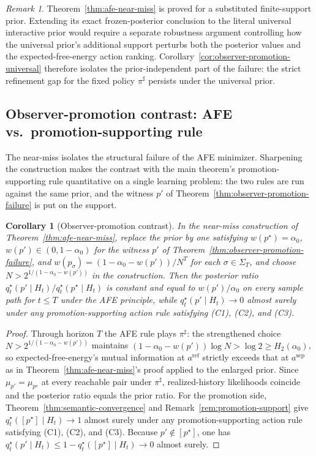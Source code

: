 \documentclass[11pt]{article}
\newtheorem{corollary}[theorem]{Corollary}
\theoremstyle{definition}
\theoremstyle{remark}
\newtheorem{remark}[theorem]{Remark}
\begin{document}
\begin{remark}
\label{rem:near-miss-universal}
Theorem~\ref{thm:afe-near-miss} is proved for a substituted finite-support prior. Extending its exact frozen-posterior conclusion to the literal universal interactive prior would require a separate robustness argument controlling how the universal prior's additional support perturbs both the posterior values and the expected-free-energy action ranking. Corollary~\ref{cor:observer-promotion-universal} therefore isolates the prior-independent part of the failure: the strict refinement gap for the fixed policy $\pi^\sharp$ persists under the universal prior.
\end{remark}

\subsection{Observer-promotion contrast: AFE vs.\ promotion-supporting rule}
\label{sec:promotion-contrast}

The near-miss isolates the structural failure of the AFE minimizer. Sharpening the construction makes the contrast with the main theorem's promotion-supporting rule quantitative on a single learning problem: the two rules are run against the same prior, and the witness $p'$ of Theorem~\ref{thm:observer-promotion-failure} is put on the support.

\begin{corollary}[Observer-promotion contrast]
\label{cor:promotion-contrast}
In the near-miss construction of Theorem~\ref{thm:afe-near-miss}, replace the prior by one satisfying $w(p^\star)=\alpha_0$, $w(p')\in(0,1-\alpha_0)$ for the witness $p'$ of Theorem~\ref{thm:observer-promotion-failure}, and $w(p_\sigma)=(1-\alpha_0-w(p'))/N^T$ for each $\sigma\in\Sigma_T$, and choose $N>2^{1/(1-\alpha_0-w(p'))}$ in the construction. Then the posterior ratio $q_t^\star(p'\mid H_t)/q_t^\star(p^\star\mid H_t)$ is constant and equal to $w(p')/\alpha_0$ on every sample path for $t\le T$ under the AFE principle, while $q_t^\star(p'\mid H_t)\to 0$ almost surely under any promotion-supporting action rule satisfying (C1), (C2), and (C3).
\end{corollary}

\begin{proof}
Through horizon $T$ the AFE rule plays $\pi^\sharp$: the strengthened choice $N>2^{1/(1-\alpha_0-w(p'))}$ maintains $(1-\alpha_0-w(p'))\log N>\log 2\ge H_2(\alpha_0)$, so expected-free-energy's mutual information at $a^{\mathrm{ref}}$ strictly exceeds that at $a^{\mathrm{sep}}$ as in Theorem~\ref{thm:afe-near-miss}'s proof applied to the enlarged prior. Since $\mu_{p'}=\mu_{p^\star}$ at every reachable pair under $\pi^\sharp$, realized-history likelihoods coincide and the posterior ratio equals the prior ratio. For the promotion side, Theorem~\ref{thm:semantic-convergence} and Remark~\ref{rem:promotion-support} give $q_t^\star([p^\star]\mid H_t)\to 1$ almost surely under any promotion-supporting action rule satisfying (C1), (C2), and (C3). Because $p'\notin[p^\star]$, one has $q_t^\star(p'\mid H_t)\le 1-q_t^\star([p^\star]\mid H_t)\to 0$ almost surely.
\end{proof}
\end{document}
